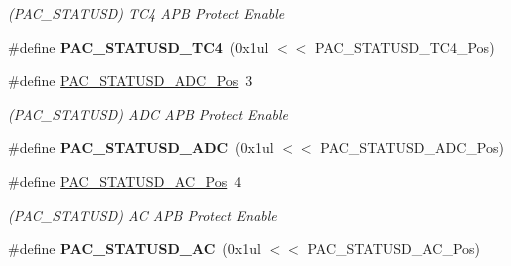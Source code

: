 \begin{DoxyCompactItemize}
\begin{DoxyCompactList}\small\item\em (P\+A\+C\+\_\+\+S\+T\+A\+T\+U\+S\+D) T\+C4 A\+P\+B Protect Enable \end{DoxyCompactList}\item 
\hypertarget{group___s_a_m_l21___p_a_c_gabe1fe96fa2bbacf8a563465b8ee8516c}{}\#define {\bfseries P\+A\+C\+\_\+\+S\+T\+A\+T\+U\+S\+D\+\_\+\+T\+C4}~(0x1ul $<$$<$ P\+A\+C\+\_\+\+S\+T\+A\+T\+U\+S\+D\+\_\+\+T\+C4\+\_\+\+Pos)\label{group___s_a_m_l21___p_a_c_gabe1fe96fa2bbacf8a563465b8ee8516c}

\item 
\hypertarget{group___s_a_m_l21___p_a_c_ga5ab6340d284b8555c64b7965ae28bb3b}{}\#define \hyperlink{group___s_a_m_l21___p_a_c_ga5ab6340d284b8555c64b7965ae28bb3b}{P\+A\+C\+\_\+\+S\+T\+A\+T\+U\+S\+D\+\_\+\+A\+D\+C\+\_\+\+Pos}~3\label{group___s_a_m_l21___p_a_c_ga5ab6340d284b8555c64b7965ae28bb3b}

\begin{DoxyCompactList}\small\item\em (P\+A\+C\+\_\+\+S\+T\+A\+T\+U\+S\+D) A\+D\+C A\+P\+B Protect Enable \end{DoxyCompactList}\item 
\hypertarget{group___s_a_m_l21___p_a_c_ga0cc1e16ab5bb30e073574f73c3143f73}{}\#define {\bfseries P\+A\+C\+\_\+\+S\+T\+A\+T\+U\+S\+D\+\_\+\+A\+D\+C}~(0x1ul $<$$<$ P\+A\+C\+\_\+\+S\+T\+A\+T\+U\+S\+D\+\_\+\+A\+D\+C\+\_\+\+Pos)\label{group___s_a_m_l21___p_a_c_ga0cc1e16ab5bb30e073574f73c3143f73}

\item 
\hypertarget{group___s_a_m_l21___p_a_c_gabb4129063b1be30de40f6e4f3168e91b}{}\#define \hyperlink{group___s_a_m_l21___p_a_c_gabb4129063b1be30de40f6e4f3168e91b}{P\+A\+C\+\_\+\+S\+T\+A\+T\+U\+S\+D\+\_\+\+A\+C\+\_\+\+Pos}~4\label{group___s_a_m_l21___p_a_c_gabb4129063b1be30de40f6e4f3168e91b}

\begin{DoxyCompactList}\small\item\em (P\+A\+C\+\_\+\+S\+T\+A\+T\+U\+S\+D) A\+C A\+P\+B Protect Enable \end{DoxyCompactList}\item 
\hypertarget{group___s_a_m_l21___p_a_c_ga4f60d9756a6b4aeeaf93342f67c1f3ac}{}\#define {\bfseries P\+A\+C\+\_\+\+S\+T\+A\+T\+U\+S\+D\+\_\+\+A\+C}~(0x1ul $<$$<$ P\+A\+C\+\_\+\+S\+T\+A\+T\+U\+S\+D\+\_\+\+A\+C\+\_\+\+Pos)\label{group___s_a_m_l21___p_a_c_ga4f60d9756a6b4aeeaf93342f67c1f3ac}


\end{DoxyCompactItemize}
